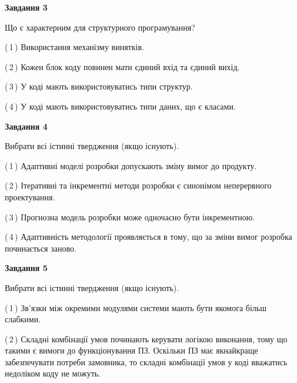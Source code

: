 \documentclass[10pt, ukrainian]{article}
\begin{document}
{\begin {large}
{\begin {center}\textbf{Завдання 3}\end {center}}\par
Що є характерним для структурного програмування?\par
\vspace{2mm}



(\,1\,) Використання механізму винятків. %



(\,2\,) Кожен блок коду повинен мати єдиний вхід та єдиний вихід.%



(\,3\,) У коді мають використовуватись типи структур. %



(\,4\,) У коді мають використовуватись типи даних, що є класами. %


{\begin {center}\textbf{Завдання 4}\end {center}}\par
Вибрати всі істинні твердження (якщо існують).\par
\vspace{2mm}



(\,1\,) Адаптивні моделі розробки допускають зміну вимог до продукту. %



(\,2\,) Ітеративні та інкрементні методи розробки є синонімом неперервного проектування. %



(\,3\,) Прогнозна модель розробки може одночасно бути інкрементною. %



(\,4\,) Адаптивність методології проявляється в тому, що за зміни вимог розробка починається заново. %


{\begin {center}\textbf{Завдання 5}\end {center}}\par
Вибрати всі істинні твердження (якщо існують).\par
\vspace{2mm}



(\,1\,) Зв'язки між окремими модулями системи мають бути якомога більш слабкими. %



(\,2\,) Складні комбінації умов починають керувати логікою виконання, тому що такими є вимоги до функціонування ПЗ. Оскільки ПЗ має якнайкраще забезпечувати потреби замовника, то складні комбінації умов у коді вважатись недоліком коду не можуть. %




\end{large}}
\end{document}
